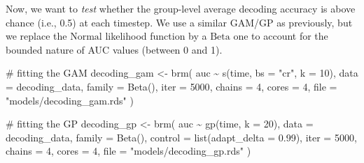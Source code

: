 \documentclass[
  doc,
  floatsintext,
  longtable,
  a4paper,
  nolmodern,
  notxfonts,
  notimes,
  colorlinks=true,linkcolor=blue,citecolor=blue,urlcolor=blue]{apa7}
\newenvironment{Shaded}{\begin{snugshade}}{\end{snugshade}}
\newcommand{\AttributeTok}[1]{\textcolor[rgb]{0.40,0.45,0.13}{#1}}
\newcommand{\CommentTok}[1]{\textcolor[rgb]{0.37,0.37,0.37}{#1}}
\newcommand{\DecValTok}[1]{\textcolor[rgb]{0.68,0.00,0.00}{#1}}
\newcommand{\FloatTok}[1]{\textcolor[rgb]{0.68,0.00,0.00}{#1}}
\newcommand{\FunctionTok}[1]{\textcolor[rgb]{0.28,0.35,0.67}{#1}}
\newcommand{\NormalTok}[1]{\textcolor[rgb]{0.00,0.23,0.31}{#1}}
\newcommand{\OtherTok}[1]{\textcolor[rgb]{0.00,0.23,0.31}{#1}}
\newcommand{\SpecialCharTok}[1]{\textcolor[rgb]{0.37,0.37,0.37}{#1}}
\newcommand{\StringTok}[1]{\textcolor[rgb]{0.13,0.47,0.30}{#1}}
\begin{document}
Now, we want to \emph{test} whether the group-level average decoding
accuracy is above chance (i.e., 0.5) at each timestep. We use a similar
GAM/GP as previously, but we replace the \(\mathrm{Normal}\) likelihood
function by a \(\mathrm{Beta}\) one to account for the bounded nature of
AUC values (between 0 and 1).

\begin{Shaded}
\begin{Highlighting}[]
\CommentTok{\# fitting the GAM}
\NormalTok{decoding\_gam }\OtherTok{\textless{}{-}} \FunctionTok{brm}\NormalTok{(}
\NormalTok{    auc }\SpecialCharTok{\textasciitilde{}} \FunctionTok{s}\NormalTok{(time, }\AttributeTok{bs =} \StringTok{"cr"}\NormalTok{, }\AttributeTok{k =} \DecValTok{10}\NormalTok{),}
    \AttributeTok{data =}\NormalTok{ decoding\_data,}
    \AttributeTok{family =} \FunctionTok{Beta}\NormalTok{(),}
    \AttributeTok{iter =} \DecValTok{5000}\NormalTok{,}
    \AttributeTok{chains =} \DecValTok{4}\NormalTok{,}
    \AttributeTok{cores =} \DecValTok{4}\NormalTok{,}
    \AttributeTok{file =} \StringTok{"models/decoding\_gam.rds"}
\NormalTok{    )}
\end{Highlighting}
\end{Shaded}

\begin{Shaded}
\begin{Highlighting}[]
\CommentTok{\# fitting the GP}
\NormalTok{decoding\_gp }\OtherTok{\textless{}{-}} \FunctionTok{brm}\NormalTok{(}
\NormalTok{    auc }\SpecialCharTok{\textasciitilde{}} \FunctionTok{gp}\NormalTok{(time, }\AttributeTok{k =} \DecValTok{20}\NormalTok{),}
    \AttributeTok{data =}\NormalTok{ decoding\_data,}
    \AttributeTok{family =} \FunctionTok{Beta}\NormalTok{(),}
    \AttributeTok{control =} \FunctionTok{list}\NormalTok{(}\AttributeTok{adapt\_delta =} \FloatTok{0.99}\NormalTok{),}
    \AttributeTok{iter =} \DecValTok{5000}\NormalTok{,}
    \AttributeTok{chains =} \DecValTok{4}\NormalTok{,}
    \AttributeTok{cores =} \DecValTok{4}\NormalTok{,}
    \AttributeTok{file =} \StringTok{"models/decoding\_gp.rds"}
\NormalTok{    )}
\end{Highlighting}
\end{Shaded}
\end{document}
